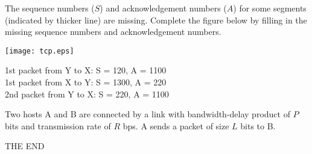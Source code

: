 \documentclass[a4paper,11pt,answers]{exam}
\begin{document}
\begin{questions}
The sequence numbers ($S$) and acknowledgement numbers ($A$) for 
some segments (indicated by thicker line) are missing.  Complete 
the figure below by filling in the missing sequence numbers and 
acknowledgement numbers.

\centerline{
        \texttt{[image: tcp.eps]}
}

\begin{solution}
1st packet from Y to X: S = 120, A = 1100\\
1st packet from X to Y: S = 1300, A = 220\\
2nd packet from Y to X: S = 220, A = 1100\\
\end{solution}

\question
Two hosts A and B are connected by a link with bandwidth-delay 
product of $P$ bits and transmission rate of $R$ bps.  A sends 
a packet of size $L$ bits to B.

\end{questions}
\vfill
\center\Huge\sf THE END
\end{document}
